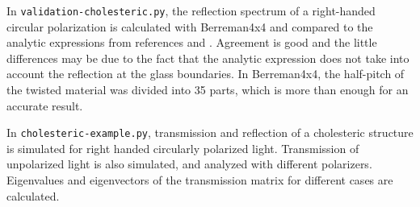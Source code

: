 In \verb/validation-cholesteric.py/, the reflection spectrum of a right-handed circular polarization is calculated with Berreman4x4 and compared to the analytic expressions from references  and .
Agreement is good and the little differences may be due to the fact that the analytic expression does not take into account the reflection at the glass boundaries.
In Berreman4x4, the half-pitch of the twisted material was divided into 35 parts, which is more than enough for an accurate result.

In \verb/cholesteric-example.py/, transmission and reflection of a cholesteric structure is simulated for right handed circularly polarized light.
Transmission of unpolarized light is also simulated, and analyzed with different polarizers.
Eigenvalues and eigenvectors of the transmission matrix for different cases are calculated.


